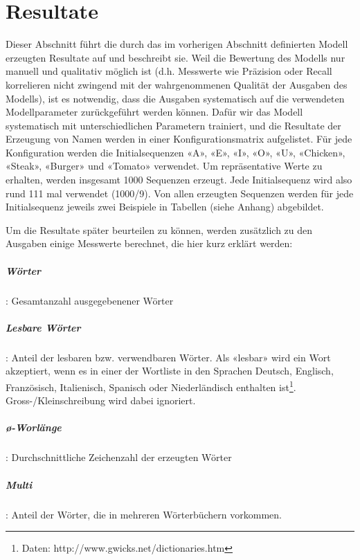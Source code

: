 \chapter{Resultate}
\label{ch:results}

Dieser Abschnitt führt die durch das im vorherigen Abschnitt definierten Modell erzeugten Resultate auf und beschreibt sie.
Weil die Bewertung des Modells nur manuell und qualitativ möglich ist (d.h. Messwerte wie Präzision oder Recall korrelieren nicht zwingend
mit der wahrgenommenen Qualität der Ausgaben des Modells), ist es notwendig, dass die Ausgaben systematisch auf die verwendeten
Modellparameter zurückgeführt werden können.
Dafür wir das Modell systematisch mit unterschiedlichen Parametern trainiert, und die Resultate der Erzeugung von Namen
werden in einer Konfigurationsmatrix aufgelistet.
Für jede Konfiguration werden die Initialsequenzen «A», «E», «I», «O», «U», «Chicken», «Steak», «Burger» und «Tomato» verwendet.
Um repräsentative Werte zu erhalten, werden insgesamt 1000 Sequenzen erzeugt.
Jede Initialsequenz wird also rund 111 mal verwendet (1000/9).
Von allen erzeugten Sequenzen werden für jede Initialsequenz jeweils zwei Beispiele in Tabellen (siehe Anhang) abgebildet.

Um die Resultate später beurteilen zu können, werden zusätzlich zu den Ausgaben einige Messwerte berechnet, die hier
kurz erklärt werden:

\paragraph{Wörter}: Gesamtanzahl ausgegebenener Wörter
\paragraph{Lesbare Wörter}: Anteil der lesbaren bzw. verwendbaren Wörter.
Als «lesbar» wird ein Wort akzeptiert, wenn es in einer der Wortliste in den Sprachen Deutsch, Englisch, Französisch, Italienisch, Spanisch oder Niederländisch enthalten ist\footnote{Daten: http://www.gwicks.net/dictionaries.htm}.
Gross-/Kleinschreibung wird dabei ignoriert.
\paragraph{ø-Worlänge}: Durchschnittliche Zeichenzahl der erzeugten Wörter
\paragraph{Multi}: Anteil der Wörter, die in mehreren Wörterbüchern vorkommen.
